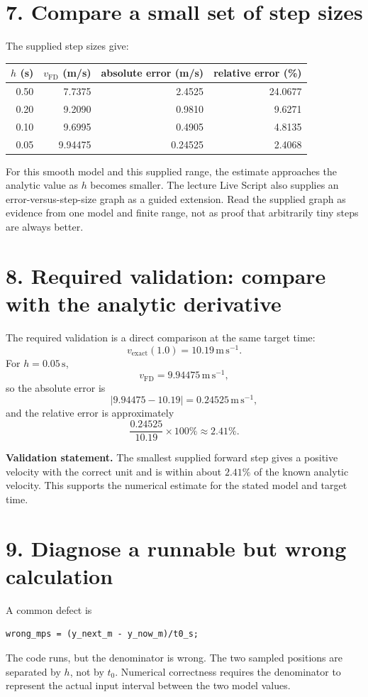\documentclass[11pt,a4paper]{article}
\newcommand{\units}[1]{\,\mathrm{#1}}
\begin{document}
\section*{7. Compare a small set of step sizes}
The supplied step sizes give:

\begin{center}\small
\begin{tabular}{rrrr}
\toprule
$h$ (s) & $v_{\mathrm{FD}}$ (m/s) & absolute error (m/s) & relative error (\%)\\
\midrule
0.50 & 7.7375 & 2.4525 & 24.0677\\
0.20 & 9.2090 & 0.9810 & 9.6271\\
0.10 & 9.6995 & 0.4905 & 4.8135\\
0.05 & 9.94475 & 0.24525 & 2.4068\\
\bottomrule
\end{tabular}
\end{center}

For this smooth model and this supplied range, the estimate approaches the analytic value as $h$ becomes smaller.
The lecture Live Script also supplies an error-versus-step-size graph as a guided extension. Read the supplied graph as evidence from one model and finite range, not as proof that arbitrarily tiny steps are always better.

\section*{8. Required validation: compare with the analytic derivative}
The required validation is a direct comparison at the same target time:
\[
v_{\mathrm{exact}}(1.0)=10.19\units{m\,s^{-1}}.
\]
For $h=0.05\units{s}$,
\[
v_{\mathrm{FD}}=9.94475\units{m\,s^{-1}},
\]
so the absolute error is
\[
|9.94475-10.19|=0.24525\units{m\,s^{-1}},
\]
and the relative error is approximately
\[
\frac{0.24525}{10.19}\times 100\%\approx 2.41\%.
\]

\begin{checkbox}\textbf{Validation statement.} The smallest supplied forward step gives a positive velocity with the correct unit and is within about $2.41\%$ of the known analytic velocity. This supports the numerical estimate for the stated model and target time.\end{checkbox}

\section*{9. Diagnose a runnable but wrong calculation}
A common defect is
\begin{lstlisting}[style=matlabstyle,caption={Example of an incorrect derivative denominator}]
wrong_mps = (y_next_m - y_now_m)/t0_s;
\end{lstlisting}
The code runs, but the denominator is wrong. The two sampled positions are separated by $h$, not by $t_0$. Numerical correctness requires the denominator to represent the actual input interval between the two model values.
\end{document}
